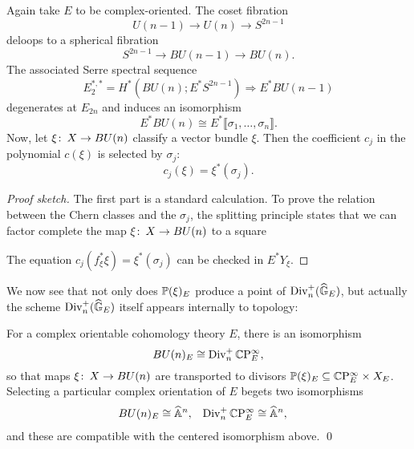 \begin{theorem}
Again take $E$ to be complex-oriented.  The coset fibration \[U(n-1) \to U(n) \to S^{2n-1}\] deloops to a spherical fibration \[S^{2n-1} \to BU(n-1) \to BU(n).\]  The associated Serre spectral sequence \[E_2^{*, *} = H^*(BU(n); E^* S^{2n-1}) \Rightarrow E^* BU(n-1)\] degenerates at $E_{2n}$ and induces an isomorphism \[E^* BU(n) \cong E^* \llbracket \sigma_1, \ldots, \sigma_n\rrbracket.\]  Now, let $\xi\co X \to BU(n)$ classify a vector bundle $\xi$.  Then the coefficient $c_j$ in the polynomial $c(\xi)$ is selected by $\sigma_j$: \[c_j(\xi) = \xi^*(\sigma_j).\]
\end{theorem}
\begin{proof}[Proof sketch]
The first part is a standard calculation.  To prove the relation between the Chern classes and the $\sigma_j$, the splitting principle states that we can factor complete the map $\xi\co X \to BU(n)$ to a square
\begin{center}
\end{center}
The equation $c_j(f_\xi^* \xi) = \xi^*(\sigma_j)$ can be checked in $E^* Y_\xi$.
\end{proof}

We now see that not only does $\P(\xi)_E$ produce a point of $\Div_n^+(\G_E)$, but actually the scheme $\Div_n^+(\G_E)$ itself appears internally to topology:

\begin{corollary}
For a complex orientable cohomology theory $E$, there is an isomorphism \[BU(n)_E \cong \Div_n^+ \CP^\infty_E,\] so that maps $\xi\co X \to BU(n)$ are transported to divisors $\P(\xi)_E \subseteq \CP^\infty_E \times X_E$.  Selecting a particular complex orientation of $E$ begets two isomorphisms
\begin{align*}
BU(n)_E & \cong \A^n, &
\Div_n^+ \CP^\infty_E & \cong \A^n,
\end{align*}
and these are compatible with the centered isomorphism above. \qed
\end{corollary}

